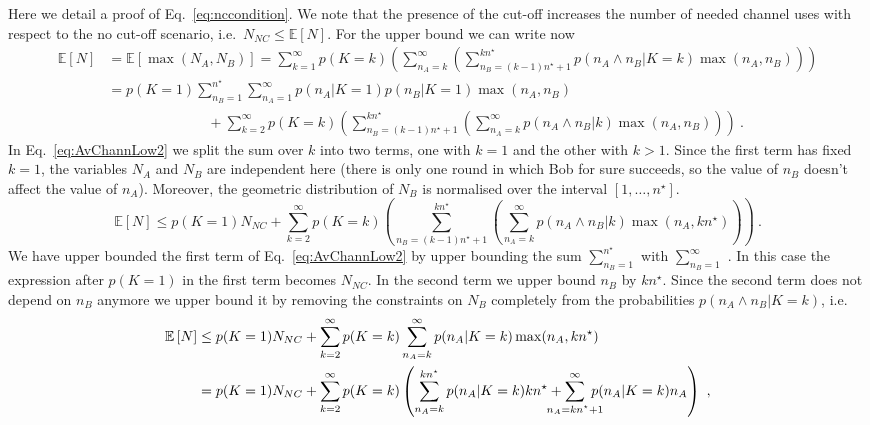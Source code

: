 \documentclass[aps,pra,reprint,superscriptaddress]{revtex4-1}
\newcommand{\nstar}{n^{\star}}
\begin{document}
Here we detail a proof of Eq.~\eqref{eq:nccondition}. We note that the presence of the cut-off increases the number of needed channel uses with respect to the no cut-off scenario, i.e.~$N_{NC} \le \mathbb{E}[N]$. For the upper bound we can write now
\begin{align}
\mathbb{E}\left[N\right]	&= \mathbb{E}\left[\max(N_A, N_B)\right] = \sum_{k=1}^\infty p(K=k) \left(\sum_{n_A=k}^\infty \left(\sum_{n_B=(k-1)\nstar +1}^{k\nstar} p(n_A \land n_B | K=k) \max(n_A, n_B) \right) \right) \\
					&= p(K=1) \sum_{n_B=1}^{\nstar} \sum_{n_A=1}^{\infty} p(n_A | K=1) p(n_B | K=1) \max(n_A, n_B)  \nonumber\\
					&\hspace{3cm} +\sum_{k=2}^\infty p(K=k) \left( \sum_{n_B=(k-1)\nstar +1}^{k\nstar}\left(\sum_{n_A=k}^\infty p(n_A \land n_B | k) \max(n_A, n_B) \right) \right)\ .
\label{eq:AvChannLow2}
\end{align}
In Eq.~\eqref{eq:AvChannLow2} we split the sum over $k$ into two terms, one with $k=1$ and the other with $k>1$. Since the first term has fixed $k=1$, the variables $N_A$ and $N_B$ are independent here (there is only one round in which Bob for sure succeeds, so the value of $n_B$ doesn't affect the value of $n_A$). Moreover, the geometric distribution of $N_B$ is normalised over the interval $[1, \ldots, \nstar]$.
\begin{equation}
\mathbb{E}\left[N\right]\le p(K=1) N_{NC} + \sum_{k=2}^\infty p(K=k) \left(\sum_{n_B=(k-1)\nstar +1}^{k\nstar}\left(\sum_{n_A=k}^\infty p(n_A \land n_B | k) \max(n_A, k \nstar) \right) \right)\ .
\label{eq:AvChannLow3}
\end{equation}
We have upper bounded the first term of Eq.~\eqref{eq:AvChannLow2} by
upper bounding the sum  $\sum_{n_B=1}^{\nstar}$  with $\sum_{n_B=1}^{\infty}$ . In this case the expression after $p(K=1)$ in the first term becomes $N_{NC}$. In the second term we upper bound $n_B$ by $k\nstar$.
Since the second term does not depend on $n_B$ anymore we upper bound
it by removing the constraints on $N_B$ completely from the
probabilities $p(n_A \land n_B | K=k)$, i.e.
\begin{align}
\mathbb{E}\left[N\right]&\le p(K=1) N_{NC} + \sum_{k=2}^\infty p(K=k) \sum_{n_A=k}^\infty p(n_A| K=k) \max(n_A, k \nstar)
\\
&= p(K=1) N_{NC} + \sum_{k=2}^\infty p(K=k) \left(\sum_{n_A=k}^{k\nstar} p(n_A| K=k) k\nstar + \sum_{\mathclap{n_A=k\nstar + 1}}^{\infty}\;p(n_A| K=k) n_A \right)\ ,
\label{eq:AvChannLow5}
\end{align}
\end{document}
